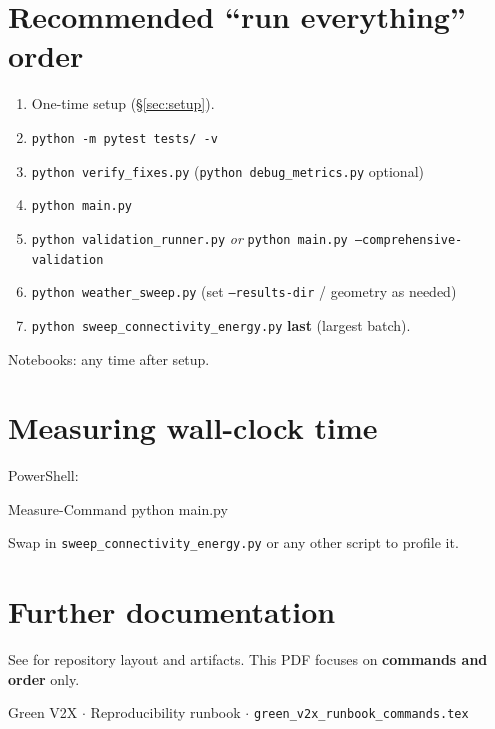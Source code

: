 \documentclass[11pt,a4paper]{article}
\newenvironment{terminal}{%
  \begin{tcolorbox}[
    enhanced,
    breakable,
    colback=gv2xCodeBg,
    colframe=gv2xCodeFrame,
    boxrule=0.6pt,
    arc=3pt,
    frame hidden,
    borderline west={4pt}{0pt}{gv2xAccentBar},
    left=10pt, right=12pt, top=8pt, bottom=8pt,
    before skip=8pt, after skip=10pt,
  ]%
  \small\ttfamily
}{%
  \end{tcolorbox}%
}
\begin{document}
\section{Recommended ``run everything'' order}
\begin{enumerate}
\item One-time setup (\S\ref{sec:setup}).
\item \texttt{python -m pytest tests/ -v}
\item \texttt{python verify\_fixes.py} (\texttt{python debug\_metrics.py} optional)
\item \texttt{python main.py}
\item \texttt{python validation\_runner.py} \emph{or} \texttt{python main.py --comprehensive-validation}
\item \texttt{python weather\_sweep.py} (set \texttt{--results-dir} / geometry as needed)
\item \texttt{python sweep\_connectivity\_energy.py} \textbf{last} (largest batch).
\end{enumerate}
Notebooks: any time after setup.

\section{Measuring wall-clock time}
PowerShell:
\begin{terminal}
Measure-Command { python main.py }
\end{terminal}
Swap in \texttt{sweep\_connectivity\_energy.py} or any other script to profile it.

\section{Further documentation}
See  for repository layout and artifacts. This PDF focuses on \textbf{commands and order} only.

\vfill
\begin{center}
{\small\color{gv2xMuted}%
\;Green V2X $\cdot$ Reproducibility runbook $\cdot$ \texttt{green\_v2x\_runbook\_commands.tex}}
\end{center}
\end{document}
